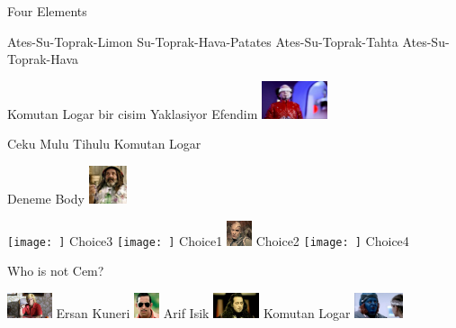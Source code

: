 \documentclass{exam}
\begin{document}
\begin{questions}
\question Four Elements\newline
\begin{oneparchoices}
\choice Ates-Su-Toprak-Limon
\choice Su-Toprak-Hava-Patates
\CorrectChoice Ates-Su-Toprak-Tahta
\choice Ates-Su-Toprak-Hava
\end{oneparchoices}
\question Komutan Logar bir cisim Yaklasiyor Efendim\newline
\includegraphics[height=3em]{tihulu.jpeg} \newline
\begin{oneparchoices}
\choice Ceku
\choice Mulu
\CorrectChoice Tihulu
\choice Komutan Logar
\end{oneparchoices}
\question Deneme Body\newline
\includegraphics[height=3em]{faruk.jpg} \newline
\begin{oneparchoices}
\choice \texttt{[image: ]}
Choice3
\CorrectChoice \texttt{[image: ]}
Choice1
\choice \includegraphics[height=2em]{216.jpg}
Choice2
\choice \texttt{[image: ]}
Choice4
\end{oneparchoices}
\question Who is not Cem?\newline
\begin{oneparchoices}
\choice \includegraphics[height=2em]{ersan.jpg}
Ersan Kuneri
\choice \includegraphics[height=2em]{arifisik.jpg}
Arif Isik
\choice \includegraphics[height=2em]{komutanlogar.jpeg}
Komutan Logar
\CorrectChoice \includegraphics[height=2em]{rendroy2.jpg}

\end{oneparchoices}
\end{questions}
\end{document}
